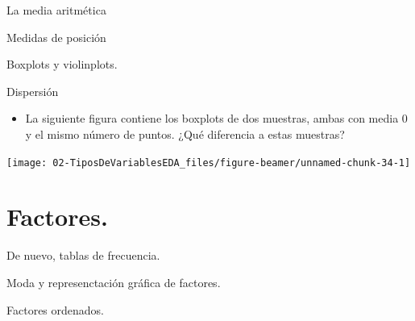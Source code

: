 \documentclass[
  9pt,
  ignorenonframetext,
]{beamer}
\providecommand{\tightlist}{%
  \setlength{\itemsep}{0pt}\setlength{\parskip}{0pt}}
\begin{document}
\begin{frame}{La media aritmética}
\protect\hypertarget{la-media-aritmetica}{}

\end{frame}

\begin{frame}{Medidas de posición}
\protect\hypertarget{medidas-de-posicion}{}

\end{frame}

\begin{frame}{Boxplots y violinplots.}
\protect\hypertarget{boxplots-y-violinplots.}{}

\end{frame}

\begin{frame}{Dispersión}
\protect\hypertarget{dispersion}{}

\begin{itemize}
\tightlist
\item
  La siguiente figura contiene los boxplots de dos muestras, ambas con
  media 0 y el mismo número de puntos. ¿Qué diferencia a estas muestras?
\end{itemize}

\begin{center}\texttt{[image: 02-TiposDeVariablesEDA\_files/figure-beamer/unnamed-chunk-34-1]} \end{center}

\end{frame}

\hypertarget{factores.}{%
\section{Factores.}\label{factores.}}

\begin{frame}{De nuevo, tablas de frecuencia.}
\protect\hypertarget{de-nuevo-tablas-de-frecuencia.}{}

\end{frame}

\begin{frame}{Moda y represenctación gráfica de factores.}
\protect\hypertarget{moda-y-represenctacion-grafica-de-factores.}{}

\end{frame}

\begin{frame}{Factores ordenados.}
\protect\hypertarget{factores-ordenados.}{}

\end{frame}
\end{document}
